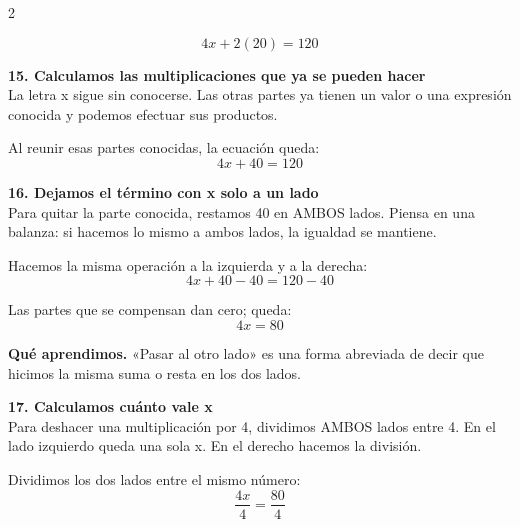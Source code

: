 \documentclass[11pt,a4paper,landscape]{article}
\begin{document}
\begin{multicols*}{2}
\begin{minipage}{\linewidth}
\[4x + 2\left(20\right)=120\]
\end{minipage}\par\medskip
\noindent\begin{minipage}{\linewidth}\textbf{15. Calculamos las multiplicaciones que ya se pueden hacer}\\[2pt]La letra x sigue sin conocerse. Las otras partes ya tienen un valor o una expresión conocida y podemos efectuar sus productos.
\par{}\par\smallskip
\par\smallskip Al reunir esas partes conocidas, la ecuación queda:
\[4x + 40=120\]
\end{minipage}\par\medskip
\noindent\begin{minipage}{\linewidth}\textbf{16. Dejamos el término con x solo a un lado}\\[2pt]Para quitar la parte conocida, restamos 40 en AMBOS lados. Piensa en una balanza: si hacemos lo mismo a ambos lados, la igualdad se mantiene.
\par\smallskip Hacemos la misma operación a la izquierda y a la derecha:
\[4x + 40 - 40=120 - 40\]
\par\smallskip Las partes que se compensan dan cero; queda:
\[4x=80\]
\par\smallskip\textbf{Qué aprendimos.} «Pasar al otro lado» es una forma abreviada de decir que hicimos la misma suma o resta en los dos lados.
\end{minipage}\par\medskip
\noindent\begin{minipage}{\linewidth}\textbf{17. Calculamos cuánto vale x}\\[2pt]Para deshacer una multiplicación por 4, dividimos AMBOS lados entre 4. En el lado izquierdo queda una sola x. En el derecho hacemos la división.
\par\smallskip Dividimos los dos lados entre el mismo número:
\[\frac{4x}{4}=\frac{80}{4}\]

\end{minipage}
\end{multicols*}
\end{document}
